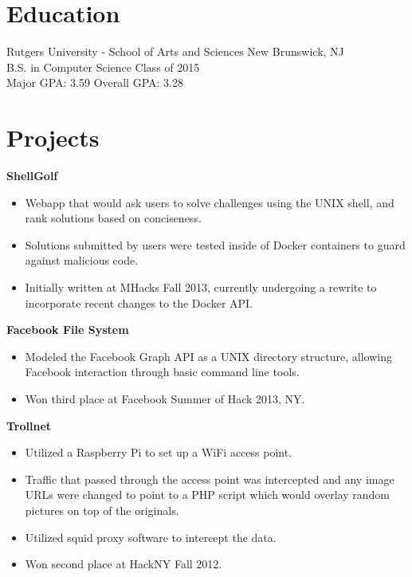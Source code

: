 \documentclass[centered,overlapped]{res}
\begin{document}
\begin{resume}
\section{Education}

Rutgers University - School of Arts and Sciences \hfill New Brunswick, NJ\\
B.S. in Computer Science \hfill Class of 2015 \\
Major GPA: 3.59 \hfill Overall GPA: 3.28



\section{Projects}

	{\bf ShellGolf}
	\begin{itemize} \itemsep -2pt
        \item Webapp that would ask users to solve challenges using the UNIX
            shell, and rank solutions based on conciseness.
        \item Solutions submitted by users were tested inside of Docker
            containers to guard against malicious code.
        \item Initially written at MHacks Fall 2013, currently undergoing a
            rewrite to incorporate recent changes to the Docker API.
	\end{itemize}

	{\bf Facebook File System}
	\begin{itemize} \itemsep -2pt
		\item Modeled the Facebook Graph API as a UNIX directory structure,
            allowing Facebook interaction through basic command line tools.
        \item Won third place at Facebook Summer of Hack 2013, NY.
	\end{itemize}

	{\bf Trollnet}
	\begin{itemize} \itemsep -2pt
		\item Utilized a Raspberry Pi to set up a WiFi access point.
		\item Traffic that passed through the access point was intercepted and
            any image URLs were changed to point to a PHP script which would
            overlay random pictures on top of the originals.
		\item Utilized squid proxy software to intercept the data.
		\item Won second place at HackNY Fall 2012.
	\end{itemize}



\end{resume}
\end{document}
